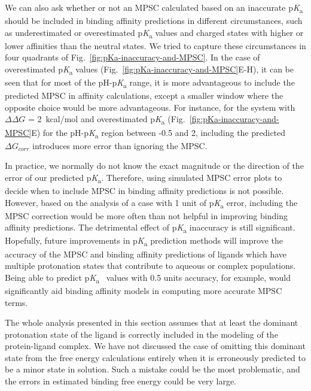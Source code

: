 \documentclass[9pt,lineno,final]{elife}
\newcommand{\pKa}{p\textit{K}\textsubscript{a}}
\begin{document}
We can also ask whether or not an MPSC calculated based on an inaccurate \pKa{} should be included in binding affinity predictions in different circumstances, such as underestimated or overestimated \pKa{} values and charged states with higher or lower affinities than the neutral states. 
We tried to capture these circumstances in four quadrants of Fig.~\ref{fig:pKa-inaccuracy-and-MPSC}. 
In the case of overestimated \pKa{} values (Fig.~\ref{fig:pKa-inaccuracy-and-MPSC}E-H), it can be seen that for most of the pH-\pKa{} range, it is more advantageous to include the predicted MPSC in affinity calculations, except a smaller window where the opposite choice would be more advantageous. 
For instance, for the system with $\Delta\Delta G$ = 2~kcal/mol and overestimated \pKa{} (Fig.~\ref{fig:pKa-inaccuracy-and-MPSC}E) for the pH-\pKa{} region between -0.5 and 2, including the predicted $\Delta G_{corr}$ introduces more error than ignoring the MPSC. 

In practice, we normally do not know the exact magnitude or the direction of the error of our predicted \pKa{}. 
Therefore, using simulated MPSC error plots to decide when to include MPSC in binding affinity predictions is not possible. 
However, based on the analysis of a case with 1 unit of \pKa{} error, including the MPSC correction would be more often than not helpful in improving binding affinity predictions. 
The detrimental effect of \pKa{} inaccuracy is still significant. 
Hopefully, future improvements in \pKa{} prediction methods will improve the accuracy of the MPSC and binding affinity predictions of ligands which have multiple protonation states that contribute to aqueous or complex populations. 
Being able to predict \pKa{}~ values with 0.5 units accuracy, for example, would significantly aid binding affinity models in computing more accurate MPSC terms.   

The whole analysis presented in this section assumes that at least the dominant protonation state of the ligand is correctly included in the modeling of the protein-ligand complex. 
We have not discussed the case of omitting this dominant state from the free energy calculations entirely when it is erroneously predicted to be a minor state in solution. 
Such a mistake could be the most problematic, and the errors in estimated binding free energy could be very large.
\end{document}
